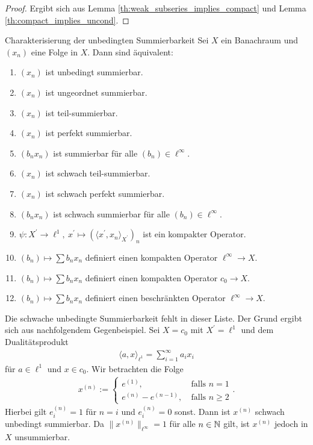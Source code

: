 \begin{proof}
	Ergibt sich aus Lemma \ref{th:weak_subseries_implies_compact} und Lemma \ref{th:compact_implies_uncond}.
\end{proof}


\begin{genericthm}{Charakterisierung der unbedingten Summierbarkeit}\label{th:equi_uncond_2}
	Sei $ X $ ein Banachraum und $ (x_n) $ eine Folge in $ X $.
	Dann sind äquivalent:
	\begin{enumerate}
		\item$  (x_n) $ ist unbedingt summierbar.
		\item $ (x_n) $ ist ungeordnet summierbar.
		\item $ (x_n) $ ist teil-summierbar.
		\item $ (x_n) $ ist perfekt summierbar.
		\item $ (b_nx_n) $ ist summierbar für alle $ (b_n) \in \ell^\infty $.
		\item $ (x_n) $ ist schwach teil-summierbar.
		\item $ (x_n) $ ist schwach perfekt summierbar.
		\item $ (b_nx_n) $ ist schwach summierbar für alle $ (b_n ) \in \ell^\infty $.
		\item $  \psi : X^\prime \to \ell^1, \ x^\prime \mapsto (\langle x^\prime , x_n \rangle_{X^\prime} )_n $ ist ein kompakter Operator.
		\item
		$ (b_n )  \mapsto \sum b_n x_n$ definiert einen kompakten Operator $ \ell^\infty \to X $.
		\item
		$ (b_n )  \mapsto \sum b_n x_n$ definiert einen kompakten Operator $ c_0 \to X $.
		\item
		$ (b_n )  \mapsto \sum b_n x_n$ definiert einen beschränkten Operator $ \ell^\infty \to X $.
	\end{enumerate}	
\end{genericthm}

Die schwache unbedingte Summierbarkeit fehlt in dieser Liste.
Der Grund ergibt sich aus nachfolgendem Gegenbeispiel. 
Sei $ X = c_0 $ mit $ X^\prime = \ell^1 $ und dem Dualitätsprodukt
\begin{align*}
	\langle a , x \rangle_{\ell^1}
	=
	\sum \limits_{ i = 1}^\infty a_i x_i
\end{align*}
für $ a  \in \ell^1 $ und $ x \in c_0 $.
Wir betrachten die Folge 
\begin{align*}
	x^{(n)} := 
	\begin{cases}
		e^{(1)}, &\ \textrm{falls } n = 1\\
		e^{(n)} - {e}^{(n-1)} , &\ \textrm{falls } n \geq 2
	\end{cases}.
\end{align*}
Hierbei gilt $ e^{(n)}_i = 1 $ für $ n= i $ und $ e^{(n)}_i = 0 $ sonst.
Dann ist $ x^{(n)} $ schwach unbedingt summierbar. 
Da $ \| x^{(n)} \|_{\ell^\infty} = 1$ für alle $ n \in \mathbb{N} $ gilt, ist $ x^{(n)} $ jedoch in $ X $ unsummierbar.



